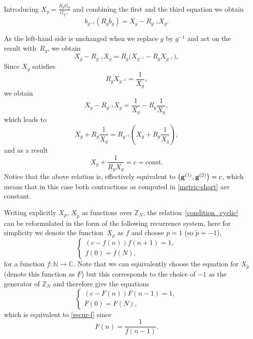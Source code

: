 \documentclass[10pt,a4paper]{amsart}
\numberwithin{equation}{section}
\newcommand{\Z}{\mathbb{Z}}
\begin{document}
Introducing $X_g=\frac{R_gG_g}{G_{g^{-1}}}$ and combining the first and the third equation we obtain
\begin{equation}
b_{g^{-1}} ( R_g b_g ) =X_g - R_{g^{-1}} X_g. \label{war_X3_1}
\end{equation}

As the left-hand side is unchanged when we replace $g$ by $g^{-1}$ and act on the result with~$R_g$, we obtain
\begin{equation*}
X_g - R_{g^{-1}} X_g = R_g \big( X_{g^{-1}}- R_{g} X_{g^{-1}} \big),
\end{equation*}
Since $X_g$ satisfies
\[ R_g X_{g^{-1}} = \frac{1}{X_g}, \]
we obtain
\[
X_g - R_{g^{-1}} X_g =\frac{1}{X_g} - R_{g} \frac{1}{X_g},
\]
which leads to
\[
X_g + R_{g} \frac{1}{X_g} = R_{g^{-1}} \left( X_g + R_g \frac{1}{X_g} \right),
\]
and as a result
\begin{equation}
\label{condition_cyclic}
X_g+\frac{1}{R_gX_g}=c=\mathrm{const}.
\end{equation}
Notice that the above relation is, effectively equivalent to $\big({\bf g}^{(1)},{\bf g}^{(2)}\big)=c$, which means that in this case both contractions as
computed in \eqref{metric-short} are constant.

Writing explicitly $X_p$, $X_{\tilde{p}}$ as functions over $\Z_N$, the relation~\eqref{condition_cyclic} can be
reformulated in the form of the following recurrence system, here for simplicity we denote the function~$X_p$
as $f$ and choose $p=1$ (so $\tilde{p}=-1$),
\begin{equation}\label{recur-f}
\begin{cases}
(c-f(n))f(n + 1)=1,\\
f(0)=f(N),
\end{cases}
\end{equation}
for a function $f\colon \mathbb{N} \rightarrow \mathbb{C}$. Note that we can equivalently choose the equation for
$X_{\tilde{p}}$ (denote this function as $F$) but this corresponds to the choice of $-1$ as the generator of $\Z_N$
and therefore give the equations
\begin{equation*}%
\begin{cases}
(c-F(n))F(n - 1)=1,\\
F(0)=F(N),
\end{cases}
\end{equation*}
which is equivalent to \eqref{recur-f} since
\[ F(n) = \frac{1}{f(n-1)}.\]
\end{document}
